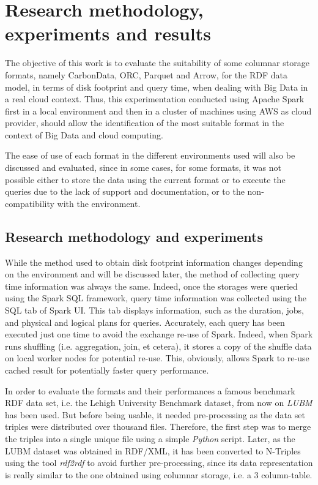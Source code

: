 \documentclass[10pt, a4paper]{report}
\begin{document}
\chapter{Research methodology, experiments and results}

The objective of this work is to evaluate the suitability of some columnar storage formats, namely CarbonData, ORC, Parquet and Arrow, for the RDF data model, in terms of disk footprint and query time, when dealing with Big Data in a real cloud context. Thus, this experimentation conducted using Apache Spark first in a local environment and then in a cluster of machines using AWS\cite{aws} as cloud provider, should allow the identification of the most suitable format in the context of Big Data and cloud computing.

The ease of use of each format in the different environments used will also be discussed and evaluated, since in some cases, for some formats, it was not possible either to store the data using the current format or to execute the queries due to the lack of support and documentation, or to the non-compatibility with the environment.

\section{Research methodology and experiments}

\label{section:research_methodology}

While the method used to obtain disk footprint information changes depending on the environment and will be discussed later, the method of collecting query time information was always the same. Indeed, once the storages were queried using the Spark SQL framework, query time information was collected using the SQL tab of Spark UI. This tab displays information, such as the duration, jobs, and physical and logical plans for queries. Accurately, each query has been executed just one time to avoid the exchange re-use of Spark. Indeed, when Spark runs shuffling (i.e. aggregation, join, et cetera), it stores a copy of the shuffle data on local worker nodes for potential re-use. This, obviously, allows Spark to re-use cached result for potentially faster query performance.

In order to evaluate the formats and their performances a famous benchmark RDF data set, i.e. the Lehigh University Benchmark dataset, from now on \textit{LUBM} has been used. But before being usable, it needed pre-processing as the data set triples were distributed over thousand files. Therefore, the first step was to merge the triples into a single unique file using a simple \textit{Python} script. Later, as the LUBM dataset was obtained in RDF/XML, it has been converted to N-Triples using the tool \textit{rdf2rdf}\cite{rdf2rdf} to avoid further pre-processing, since its data representation is really similar to the one obtained using columnar storage, i.e. a 3 column-table.
\end{document}
